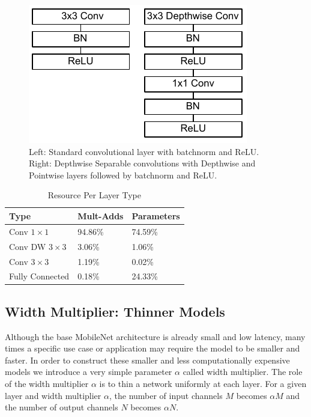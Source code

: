 \documentclass[10pt,twocolumn,letterpaper]{article}
\begin{document}
\begin{figure}
  \centering
  \includegraphics[width=0.8\linewidth]{conv_layers.pdf}
  \caption{Left: Standard convolutional layer with batchnorm and ReLU. Right: Depthwise Separable convolutions with Depthwise and Pointwise layers followed by batchnorm and ReLU.}
  \label{fig:conv_layers}
\end{figure}

\begin{table}[t]
  \caption{Resource Per Layer Type} %
\centering %
\begin{tabular}{l | l | l} %
\hline\hline %
 Type & Mult-Adds  & Parameters \\ [0.5ex] %
\hline %
Conv $1 \times 1$ & 94.86\% & 74.59\%   \\ %
\hline
Conv DW $3 \times 3$ & 3.06\% & 1.06\% \\
\hline
Conv $3 \times 3$ & 1.19\% & 0.02\% \\
\hline
Fully Connected & 0.18\% & 24.33\% \\
[1ex] %
\hline %
\end{tabular}
\label{table:percent} %
\end{table}

\subsection{Width Multiplier: Thinner Models}

Although the base MobileNet architecture is already small and low latency, many times a specific use case or application may require the model to be smaller and faster. In order to construct these smaller and less computationally expensive models we introduce a very simple parameter $\alpha$ called width multiplier. The role of the width multiplier $\alpha$ is to thin a network uniformly at each layer. For a given layer and width multiplier $\alpha$, the number of input channels $M$ becomes $\alpha M$ and the number of output channels $N$ becomes $\alpha N$.
\end{document}
